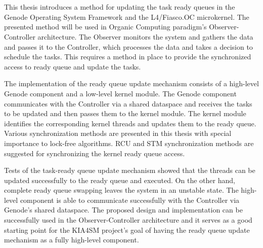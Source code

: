 \chapter{\abstractname}



This thesis introduces a method for updating the task ready queues in the Genode Operating System Framework and the L4/Fiasco.OC microkernel. The presented method will be used in Organic Computing paradigm's Observer-Controller architecture. The Observer monitors the system and gathers the data and passes it to the Controller, which processes the data and takes a decision to schedule the tasks. This requires a method in place to provide the synchronized access to ready queue and update the tasks.

The implementation of the ready queue update mechanism consists of a high-level Genode component and a low-level kernel module. The Genode component communicates with the Controller via a shared dataspace and receives the tasks to be updated and then passes them to the kernel module. The kernel module identifies the corresponding kernel threads and updates them to the ready queue. Various synchronization methods are presented in this thesis with special importance to lock-free algorithms. RCU and STM synchronization methods are suggested for synchronizing the kernel ready queue access. 

Tests of the task-ready queue update mechanism showed that the threads can be updated successfully to the ready queue and executed. On the other hand, complete ready queue swapping leaves the system in an unstable state. The high-level component is able to communicate successfully with the Controller via Genode's shared dataspace. The proposed design and implementation can be successfully used in the Observer-Controller architecture and it serves as a good starting point for the KIA4SM project's goal of having the ready queue update mechanism as a fully high-level component.

